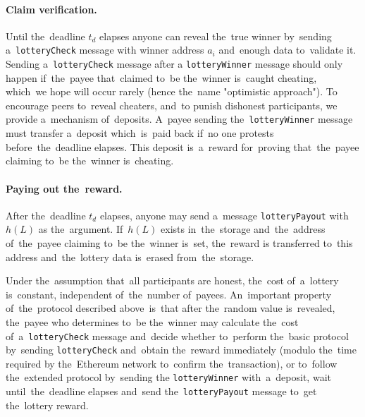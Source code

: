 \documentclass[a4paper]{article}
\newcommand{\lotteryhash}[1]{h({#1})}
\begin{document}
    \paragraph{Claim verification.}
    Until the~deadline $t_d$ elapses anyone can reveal the~true winner by~sending a~\texttt{lotteryCheck} message with
    winner address $a_i$ and~enough data to~validate it. Sending a~\texttt{lotteryCheck} message after a
    \texttt{lotteryWinner} message should only happen if~the~payee that~claimed to~be the~winner is~caught cheating,
    which~we hope will occur rarely (hence the~name "optimistic approach"). To encourage peers to~reveal cheaters,
    and~to punish dishonest participants, we provide a~mechanism of~deposits. A~payee sending the~\texttt{lotteryWinner}
    message must transfer a~deposit which~is~paid back if~no one protests before~the~deadline elapses.
    This deposit is~a~reward for~proving that~the~payee claiming to~be the~winner is~cheating.

    \paragraph{Paying out the~reward.}
    After the~deadline $t_d$ elapses, anyone may send a~message \texttt{lotteryPayout} with~$\lotteryhash{L}$ as the~argument.
    If~$\lotteryhash{L}$ exists in~the~storage and~the~address of~the~payee claiming to~be the~winner is~set, the~reward is
    transferred to~this address and~the~lottery data is~erased from~the~storage.

    Under the~assumption that~all participants are honest, the~cost of~a~lottery is~constant, independent of~the~number
    of~payees.
    An~important property of~the~protocol described above~is~that after the~random value is~revealed, the~payee who
    determines to~be the~winner may calculate the~cost of~a~\texttt{lotteryCheck} message and~decide whether to~perform
    the~basic protocol by~sending \texttt{lotteryCheck} and~obtain the~reward immediately (modulo the~time required by
    the~Ethereum network to~confirm the~transaction), or to~follow the~extended protocol by~sending the
    \texttt{lotteryWinner} with~a~deposit, wait until~the~deadline elapses and~send the~\texttt{lotteryPayout} message
    to~get the~lottery reward.
\end{document}

